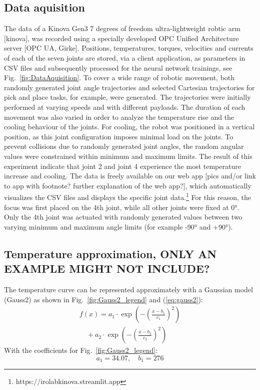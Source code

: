 \documentclass{ifacconf}
\begin{document}
\subsection{Data aquisition}
The data of a Kinova Gen3 7 degrees of freedom ultra-lightweight robtic arm [kinova], was recorded using a specially developed OPC Unified Architecture server [OPC UA, Girke]. 
Positions, temperatures, torques, velocities and currents of each of the seven joints are stored, via a client application, as parameters in CSV files and subsequently processed for the neural network trainings, see Fig.~\ref{fig:DataAquisition}.
To cover a wide range of robotic movement, both randomly generated joint angle trajectories and selected Cartesian trajectories for pick and place tasks, for example, were generated. 
The trajectories were initially performed at varying speeds and with different payloads. The duration of each movement was also varied in order to analyze the temperature rise and the cooling behaviour of the joints. 
For cooling, the robot was positioned in a vertical position, as this joint configuration imposes minimal load on the joints. 
To prevent collisions due to randomly generated joint angles, the random angular values were constrained within minimum and maximum limits. 
The result of this experiment indicate that joint 2 and joint 4 experience the most temperature increase and cooling. The data is freely available on our web app [pics and/or link to app with footnote? further explanation of the web app?], 
which automatically visualizes the CSV files and displays the specific joint data.\footnote{https://irolabkinova.streamlit.app}  
For this reason, the focus was first placed on the 4th joint, while all other joints were fixed at 0°. Only the 4th joint was actuated with randomly generated values between two varying minimum and maximum angle limits (for example -90° and +90°).

\subsection{Temperature approximation, ONLY AN EXAMPLE MIGHT NOT INCLUDE?}
The temperature curve can be represented approximately with a Gaussian model (Gauss2) as shown in Fig.~\ref{fig:Gauss2_legend} and (\ref{eq:gauss2}):
\begin{equation} \label{eq:gauss2}
  \begin{array}{l}
  f(x) = a_1 \cdot \exp\left( -\left( \frac{x - b_1}{c_1} \right)^2 \right) \\
  \quad + a_2 \cdot \exp\left( -\left( \frac{x - b_2}{c_2} \right)^2 \right)
  \end{array}
  \end{equation}
With the coefficients for Fig.~\ref{fig:Gauss2_legend}:
\[
a_1 = 34.07, \quad b_1 = 276 
\]
\end{document}
